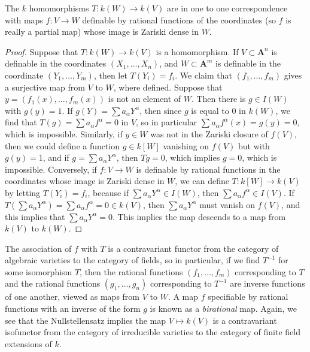 \begin{theorem}
    The $k$ homomorphisms $T: k(W) \to k(V)$ are in one to one correspondence with maps $f: V \to W$ definable by rational functions of the coordinates (so $f$ is really a partial map) whose image is Zariski dense in $W$.
\end{theorem}
\begin{proof}
    Suppose that $T: k(W) \to k(V)$ is a homomorphism. If $V \subset \mathbf{A}^n$ is definable in the coordinates $(X_1, \dots, X_n)$, and $W \subset \mathbf{A}^m$ is definable in the coordinate $(Y_1, \dots, Y_m)$, then let $T(Y_i) = f_i$. We claim that $(f_1, \dots, f_m)$ gives a surjective map from $V$ to $W$, where defined. Suppose that $y = (f_1(x), \dots, f_m(x))$ is not an element of $W$. Then there is $g \in I(W)$ with $g(y) = 1$. If $g(Y) = \sum a_\alpha Y^\alpha$, then since $g$ is equal to 0 in $k(W)$, we find that $T(g) = \sum a_\alpha f^\alpha = 0$ in $V$, so in particular $\sum a_\alpha f^\alpha(x) = g(y) = 0$, which is impossible. Similarly, if $y \in W$ was not in the Zariski closure of $f(V)$, then we could define a function $g \in k[W]$ vanishing on $f(V)$ but with $g(y) = 1$, and if $g = \sum a_\alpha Y^\alpha$, then $Tg = 0$, which implies $g = 0$, which is impossible. Conversely, if $f: V \to W$ is definable by rational functions in the coordinates whose image is Zariski dense in $W$, we can define $T: k[W] \to k(V)$ by letting $T(Y_i) = f_i$, because if $\sum a_\alpha Y^\alpha \in I(W)$, then $\sum a_\alpha f^\alpha \in I(V)$. If $T(\sum a_\alpha Y^\alpha) = \sum a_\alpha f^\alpha = 0 \in k(V)$, then $\sum a_\alpha Y^\alpha$ must vanish on $f(V)$, and this implies that $\sum a_\alpha Y^\alpha = 0$. This implies the map descends to a map from $k(V)$ to $k(W)$.
\end{proof}

The association of $f$ with $T$ is a contravariant functor from the category of algebraic varieties to the category of fields, so in particular, if we find $T^{-1}$ for some isomorphism $T$, then the rational functions $(f_1, \dots, f_m)$ corresponding to $T$ and the rational functions $(g_1, \dots, g_n)$ corresponding to $T^{-1}$ are inverse functions of one another, viewed as maps from $V$ to $W$. A map $f$ specifiable by rational functions with an inverse of the form $g$ is known as a \emph{birational} map. Again, we see that the Nullstellensatz implies the map $V \mapsto k(V)$ is a contravariant isofunctor from the category of irreducible varieties to the category of finite field extensions of $k$.

